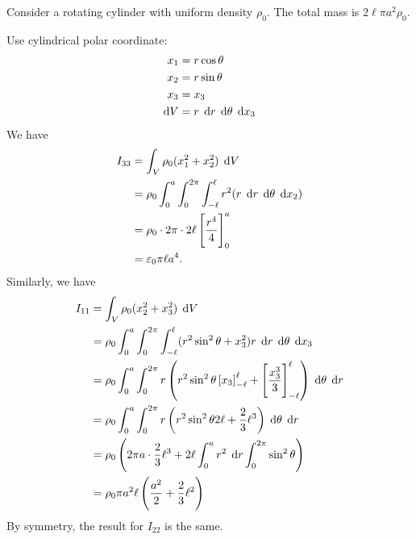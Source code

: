 \begin{exa}
  Consider a rotating cylinder with uniform density $\rho_0$. The total mass is $2\ell \pi a^2 \rho_0$.
  \begin{center}
  \end{center}
  Use cylindrical polar coordinate:
  \begin{align*}
    x_1 &= r\cos \theta\\
    x_2 &= r\sin \theta\\
    x_3 &= x_3\\
    \d V &= r\;\d r\;\d \theta \;\d x_3
  \end{align*}
  We have
  \begin{align*}
    I_{33} &= \dint_V \rho_0 (x_1^2 + x_2^2)\;\d V\\
    &= \rho_0 \dint_0^a \dint_0^{2\pi} \dint_{-\ell}^\ell r^2 (r\;\d r\;\d \theta \;\d x_2)\\
    &= \rho_0 \cdot 2\pi \cdot 2\ell \left[\dfrac{r^4}{4}\right]_0^a\\
    &= \varepsilon_0 \pi \ell a^4.
  \end{align*}
  Similarly, we have
  \begin{align*}
    I_{11} &= \dint_V \rho_0 (x_2^2 + x_3^2)\;\d V\\
    &= \rho_0 \dint_0^a \dint_0^{2\pi}\dint_{-\ell}^\ell (r^2 \sin^2 \theta + x_3^2) r\;\d r\;\d \theta \;\d x_3\\
    &= \rho_0 \dint_0^a \dint_0^{2\pi} r\left(r^2 \sin^2 \theta\left[x_3\right]_{-\ell}^\ell + \left[\dfrac{x_3^3}{3}\right]^{\ell}_{-\ell}\right)\;\d \theta\;\d r\\
    &= \rho_0 \dint_0^a \dint_0^{2\pi} r\left(r^2 \sin^2 \theta 2\ell + \dfrac{2}{3}\ell^3\right)\;\d \theta\;\d r\\
    &= \rho_0 \left(2\pi a \cdot \dfrac{2}{3}\ell^3 + 2\ell\dint_0^a r^2 \;\d r\dint_0^{2\pi}\sin^2 \theta\right)\\
    &= \rho_0 \pi a^2 \ell\left(\dfrac{a^2}{2} + \dfrac{2}{3}\ell^2\right)
  \end{align*}
  By symmetry, the result for $I_{22}$ is the same.


\end{exa}
